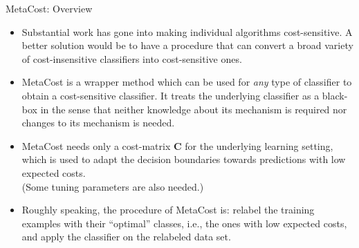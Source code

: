 	



\begin{vbframe}{MetaCost: Overview}
%	
	\small{
	\begin{itemize}
%		
		\item Substantial work has gone into making individual algorithms cost-sensitive. A better solution would be to have a procedure that can convert a broad variety of cost-insensitive classifiers into cost-sensitive ones.
%		
		\item MetaCost is a wrapper method which can be used for \emph{any} type of classifier to obtain a cost-sensitive classifier. It treats the underlying classifier as a black-box in the sense that neither knowledge about its mechanism is required nor changes to its mechanism is needed.
%		
		\item MetaCost needs only a cost-matrix $\mathbf{C}$ for the underlying learning setting, which is used to adapt the decision boundaries towards predictions with low expected costs. \\
		{\scriptsize (Some tuning parameters are also needed.)}
%		
		\item Roughly speaking, the procedure of MetaCost is: relabel the training examples with their ``optimal'' classes, i.e., the ones with low expected costs, and apply the classifier on the relabeled data set.
		
%		
	\end{itemize}
%
	}
%	
\end{vbframe}


